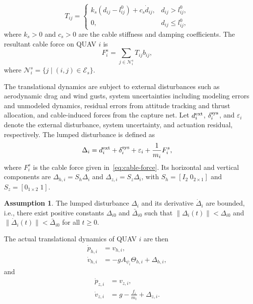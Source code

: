 \documentclass[letterpaper,journal]{IEEEtran}
\theoremstyle{plain}
\theoremstyle{definition}
\newtheorem{assumption}{Assumption}
\theoremstyle{remark}
\begin{document}
\begin{equation}
T_{ij}=
\begin{cases}
k_s(d_{ij}-l_{ij}^0)+c_s\dot d_{ij}, & d_{ij}>l_{ij}^0,\\
0, & d_{ij}\le l_{ij}^0,
\end{cases}
\label{eq:cable-tension}
\end{equation}
where \(k_s>0\) and \(c_s>0\) are the cable stiffness and damping coefficients. The resultant cable force on QUAV \(i\) is
\begin{equation}
F_i^{s}=\sum_{j\in\mathcal N_i^s}T_{ij}b_{ij},
\label{eq:cable-force}
\end{equation}
where \(\mathcal N_i^s=\{j\mid (i,j)\in\mathcal E_s\}\).

The translational dynamics are subject to external disturbances such as aerodynamic drag and wind gusts, system uncertainties including modeling errors and unmodeled dynamics, residual errors from attitude tracking and thrust allocation, and cable-induced forces from the capture net. Let \(d_i^{\rm ext}\), \(\delta_i^{\rm sys}\), and \(\varepsilon_i\) denote the external disturbance, system uncertainty, and actuation residual, respectively. The lumped disturbance is defined as
\begin{equation}
\Delta_i=d_i^{\rm ext}+\delta_i^{\rm sys}+\varepsilon_i+\frac{1}{m_i}F_i^s,
\label{eq:lumped-disturbance}
\end{equation}
where \(F_i^s\) is the cable force given in~\eqref{eq:cable-force}. Its horizontal and vertical components are \(\Delta_{h,i}=S_h\Delta_i\) and \(\Delta_{z,i}=S_z\Delta_i\), with \(S_h=[I_2\;0_{2\times1}]\) and \(S_z=[0_{1\times2}\;1]\).

\begin{assumption}
\label{ass:disturbance-bounded}
The lumped disturbance \(\Delta_i\) and its derivative \(\dot\Delta_i\) are bounded, i.e., there exist positive constants \(\Delta_{i0}\) and \(\bar\Delta_{i0}\) such that \(\|\Delta_i(t)\|<\Delta_{i0}\) and \(\|\dot\Delta_i(t)\|<\bar\Delta_{i0}\) for all \(t\ge0\).
\end{assumption}

The actual translational dynamics of QUAV \(i\) are then
\begin{equation}
\begin{aligned}
\dot p_{h,i}&=v_{h,i},\\
\dot v_{h,i}&=-gA_{\psi_i}\Theta_{h,i}+\Delta_{h,i},
\end{aligned}
\label{eq:quadrotor-horizontal}
\end{equation}
and
\begin{equation}
\begin{aligned}
\dot p_{z,i}&=v_{z,i},\\
\dot v_{z,i}&=g-\frac{f_i}{m_i}+\Delta_{z,i}.
\end{aligned}
\label{eq:quadrotor-altitude}
\end{equation}
\end{document}
